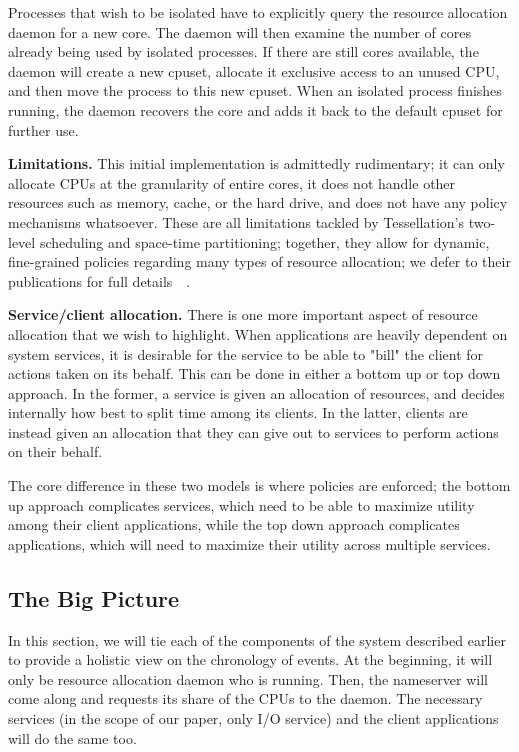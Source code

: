 \documentclass[letterpaper,twocolumn,10pt]{article}
\begin{document}
Processes that wish to be isolated have to explicitly query the resource allocation daemon for a new core. The daemon will then examine the number of cores already being used by isolated processes. If there are still cores available, the daemon will create a new cpuset, allocate it exclusive access to an unused CPU, and then move the process to this new cpuset. When an isolated process finishes running, the daemon recovers the core and adds it back to the default cpuset for further use.

\textbf{Limitations.} This initial implementation is admittedly rudimentary; it can only allocate CPUs at the granularity of entire cores, it does not handle other resources such as memory, cache, or the hard drive, and does not have any policy mechanisms whatsoever. These are all limitations tackled by Tessellation's two-level scheduling and space-time partitioning; together, they allow for dynamic, fine-grained policies regarding many types of resource allocation; we defer to their publications for full details~\cite{liu09tessellation}~\cite{tessellation-hotpar10}.

\textbf{Service/client allocation.} There is one more important aspect of resource allocation that we wish to highlight. When applications are heavily dependent on system services, it is desirable for the service to be able to "bill" the client for actions taken on its behalf. This can be done in either a bottom up or top down approach. In the former, a service is given an allocation of resources, and decides internally how best to split time among its clients. In the latter, clients are instead given an allocation that they can give out to services to perform actions on their behalf.

The core difference in these two models is where policies are enforced; the bottom up approach complicates services, which need to be able to maximize utility among their client applications, while the top down approach complicates applications, which will need to maximize their utility across multiple services.

\subsection{The Big Picture}

In this section, we will tie each of the components of the system described earlier to provide a holistic view on the chronology of events. At the beginning, it will only be resource allocation daemon who is running. Then, the nameserver will come along and requests its share of the CPUs to the daemon. The necessary services (in the scope of our paper, only I/O service) and the client applications will do the same too. 
\end{document}
